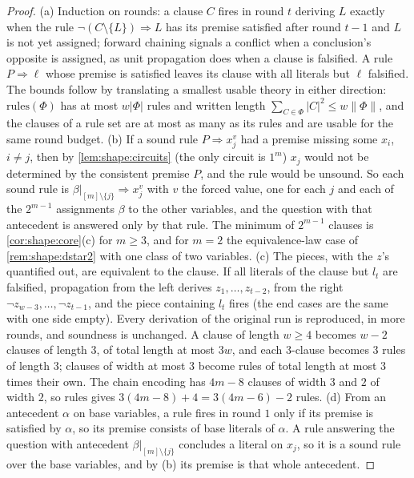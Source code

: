 \begin{proof}
(a) Induction on rounds: a clause $C$ fires in round $t$ deriving $L$ exactly when the rule $\neg(C\setminus\{L\})\Rightarrow L$ has its premise satisfied after round $t-1$ and $L$ is not yet assigned; forward chaining signals a conflict when a conclusion's opposite is assigned, as unit propagation does when a clause is falsified. A rule $P\Rightarrow\ell$ whose premise is satisfied leaves its clause with all literals but $\ell$ falsified. The bounds follow by translating a smallest usable theory in either direction: $\mathrm{rules}(\Phi)$ has at most $w\lvert\Phi\rvert$ rules and written length $\sum_{C\in\Phi}\lvert C\rvert^2\le w\lVert\Phi\rVert$, and the clauses of a rule set are at most as many as its rules and are usable for the same round budget.
(b) If a sound rule $P\Rightarrow x_j^v$ had a premise missing some $x_i$, $i\ne j$, then by \cref{lem:shape:circuits} (the only circuit is $1^m$) $x_j$ would not be determined by the consistent premise $P$, and the rule would be unsound. So each sound rule is $\beta|_{[m]\setminus\{j\}}\Rightarrow x_j^{v}$ with $v$ the forced value, one for each $j$ and each of the $2^{m-1}$ assignments $\beta$ to the other variables, and the question with that antecedent is answered only by that rule. The minimum of $2^{m-1}$ clauses is \cref{cor:shape:core}(c) for $m\ge3$, and for $m=2$ the equivalence-law case of \cref{rem:shape:dstar2} with one class of two variables.
(c) The pieces, with the $z$'s quantified out, are equivalent to the clause. If all literals of the clause but $l_t$ are falsified, propagation from the left derives $z_1,\dots,z_{t-2}$, from the right $\neg z_{w-3},\dots,\neg z_{t-1}$, and the piece containing $l_t$ fires (the end cases are the same with one side empty). Every derivation of the original run is reproduced, in more rounds, and soundness is unchanged. A clause of length $w\ge4$ becomes $w-2$ clauses of length $3$, of total length at most $3w$, and each $3$-clause becomes $3$ rules of length $3$; clauses of width at most $3$ become rules of total length at most $3$ times their own. The chain encoding has $4m-8$ clauses of width $3$ and $2$ of width $2$, so $\mathrm{rules}$ gives $3(4m-8)+4=3(4m-6)-2$ rules.
(d) From an antecedent $\alpha$ on base variables, a rule fires in round $1$ only if its premise is satisfied by $\alpha$, so its premise consists of base literals of $\alpha$. A rule answering the question with antecedent $\beta|_{[m]\setminus\{j\}}$ concludes a literal on $x_j$, so it is a sound rule over the base variables, and by (b) its premise is that whole antecedent.
\end{proof}

